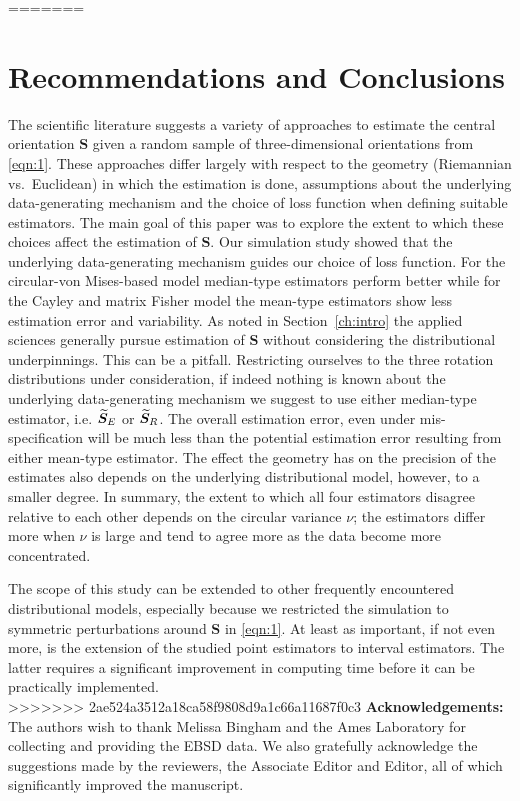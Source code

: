 =======
\section{Recommendations and Conclusions}\label{sec:disc}

The scientific literature suggests a variety of approaches to estimate the central orientation $\bm S$ given a random sample of three-dimensional orientations from \eqref{eqn:1}. These approaches differ largely with respect to the geometry (Riemannian vs.~Euclidean) in which the estimation is done, assumptions about the underlying data-generating mechanism and the choice of loss function when defining suitable estimators. The main goal of this paper was to explore the extent to which these choices affect the estimation of $\bm S$. 
Our simulation study showed that  the underlying data-generating mechanism guides our choice of loss function.  For the circular-von Mises-based model median-type estimators perform better while for the Cayley and matrix Fisher model the mean-type estimators show less estimation error and variability. As noted in Section~\ref{ch:intro} the applied sciences generally pursue estimation of $\bm S$ without considering the distributional underpinnings. This can be a pitfall. Restricting ourselves to the three rotation distributions under consideration,  if indeed nothing is known about the underlying data-generating mechanism we suggest to use either median-type estimator, i.e. ${\widetilde{\bm S}_E}$ or ${\widetilde{\bm S}_R}$. The overall estimation error, even under mis-specification will be much less than the potential estimation error resulting from either mean-type estimator. The effect the geometry has on the precision of the estimates also depends on the underlying distributional model, however, to a smaller degree. %
In summary, the extent to which all four estimators disagree relative to each other depends on the circular variance $\nu$; the estimators differ more when $\nu$ is large and tend to agree more as the data become more concentrated.  
   
The scope of this study can be extended to other frequently encountered distributional models, especially because we restricted the simulation to symmetric perturbations around $\bm S$ in \eqref{eqn:1}. At least as important, if not even more, is the extension of the studied point estimators to interval estimators. The latter requires a significant improvement in computing time before it can be practically implemented. \\

>>>>>>> 2ae524a3512a18ca58f9808d9a1c66a11687f0c3
\noindent \textbf{Acknowledgements:} The authors wish to thank Melissa Bingham and the Ames Laboratory for collecting and providing the EBSD data. We also gratefully acknowledge the suggestions made by the reviewers, the Associate Editor and Editor, all of which significantly improved the manuscript.